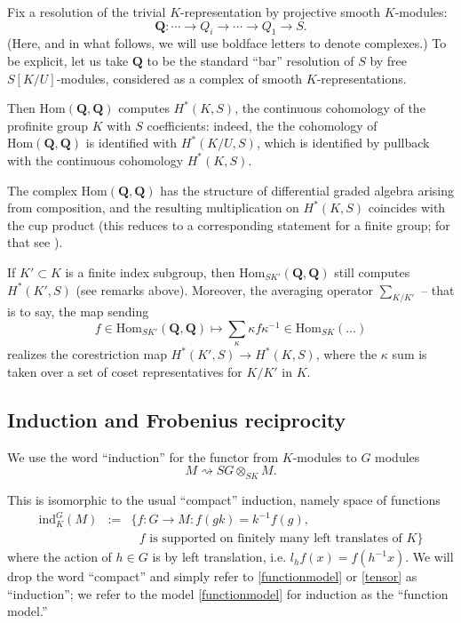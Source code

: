 \documentclass[10pt]{amsart}
\newcommand{\changecolor}{black}
\newcommand{\Hom}{\mathrm{Hom}}
\newcommand{\ind}{\mathrm{ind}}
\theoremstyle{remark}
\begin{document}
 Fix 
a resolution of the trivial $K$-representation by projective smooth $K$-modules: 
\begin{equation} \label{Qdef-eqn} \mathbf{Q}: \cdots \rightarrow Q_i \rightarrow \cdots \rightarrow Q_1 \rightarrow S.\end{equation}
{\color{\changecolor} (Here, and in what follows, we will use boldface letters to denote complexes.) }  To be explicit, let us take $\mathbf{Q}$ to be the standard ``bar'' resolution of $S$ by free $S[K/U]$-modules,
considered as a complex of smooth $K$-representations. 

Then $\Hom(\mathbf{Q}, \mathbf{Q})$  computes $H^*(K, S)$,
the continuous cohomology of the profinite group $K$ with $S$ coefficients: indeed, the   the cohomology of
$\Hom(\mathbf{Q}, \mathbf{Q})$  is identified with $H^*(K/U, S)$,  which is identified by pullback with the continuous cohomology $H^*(K, S)$.
 

The  complex $\Hom(\mathbf{Q}, \mathbf{Q})$ has the structure of differential graded algebra arising from composition, and    the resulting multiplication on $H^*(K, S)$ 
coincides with the cup product (this reduces to a corresponding statement for a finite group; for that see \cite{Yoneda}). 
 
If $K' \subset K$ is a finite index subgroup, then $\Hom_{SK'} (\mathbf{Q}, \mathbf{Q})$
still computes $H^*(K', S)$ (see remarks above).  Moreover, the averaging operator $\sum_{K/K'}$
-- that is to say, the map sending  
$$ f \in  \Hom_{SK'}(\mathbf{Q}, \mathbf{Q}) \mapsto  \sum_{\kappa} \kappa f \kappa^{-1} \in \Hom_{SK}(\dots) $$ 
realizes the corestriction map $H^*(K', S) \rightarrow H^*(K, S)$, where the $\kappa$ sum is taken over a set of coset representatives for $K/K'$ in $K$. 
 
 
  



  \subsection{Induction and Frobenius reciprocity } 
We use the word ``induction'' for the functor from $K$-modules to $G$ modules
 \begin{equation} \label{tensor} M \rightsquigarrow  SG \otimes_{ SK} M.\end{equation}

This is  isomorphic to the usual ``compact''  induction, namely
space of functions
\begin{eqnarray} \label{functionmodel} \ind_K^G(M)  &:=&   \{ f: G \rightarrow M: f(g k) = k^{-1} f(g), 
\\  \nonumber  &&  \mbox{ $f$ is supported on finitely many left translates of $K$} \} \end{eqnarray}
 where the action of $h \in G$ is by left translation, i.e. $l_h f(x) = f(h^{-1} x)$. 
 We will drop the word ``compact'' and simply refer to \eqref{functionmodel}
 or \eqref{tensor} as ``induction''; we refer to the 
model  \eqref{functionmodel} for induction as the ``function model.'' 
\end{document}
